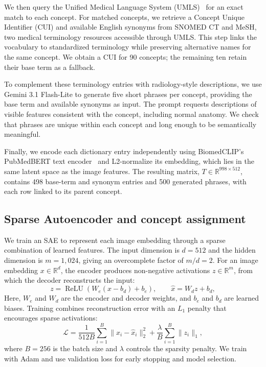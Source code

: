 We then query the Unified Medical Language System (UMLS)~\cite{bodenreider2004umls} for an exact match to each concept. For matched concepts, we retrieve a Concept Unique Identifier (CUI) and available English synonyms from SNOMED CT and MeSH, two medical terminology resources accessible through UMLS. This step links the vocabulary to standardized terminology while preserving alternative names for the same concept. We obtain a CUI for 90 concepts; the remaining ten retain their base term as a fallback.

To complement these terminology entries with radiology-style descriptions, we use Gemini 3.1 Flash-Lite to generate five short phrases per concept, providing the base term and available synonyms as input. The prompt requests descriptions of visible features consistent with the concept, including normal anatomy. We check that phrases are unique within each concept and long enough to be semantically meaningful. 

Finally, we encode each dictionary entry independently using BiomedCLIP’s PubMedBERT text encoder~\cite{zhang2023biomedclip} and L2-normalize its embedding, which lies in the same latent space as the image features. The resulting matrix, \(T\in\mathbb{R}^{998\times512}\), contains 498 base-term and synonym entries and 500 generated phrases, with each row linked to its parent concept.


\subsection{Sparse Autoencoder and concept assignment}
We train an SAE to represent each image embedding through a sparse combination of learned features. The input dimension is $d=512$ and the hidden dimension is $m=1,024$, giving an overcomplete factor of $m/d=2$. For an image embedding $x\in\mathbb{R}^{d}$, the encoder produces non-negative activations $z\in\mathbb{R}^{m}$, from which the decoder reconstructs the input:
\begin{equation}
z=\operatorname{ReLU}(W_e(x-b_d)+b_e),\qquad
\hat{x}=W_dz+b_d,
\end{equation}
Here, $W_e$ and $W_d$ are the encoder and decoder weights, and $b_e$ and $b_d$ are learned biases. Training combines reconstruction error with an $L_1$ penalty that encourages sparse activations:
\begin{equation}
\mathcal{L}=\frac{1}{512B}\sum_{i=1}^{B}\|x_i-\hat{x}_i\|_2^2
+\frac{\lambda}{B}\sum_{i=1}^{B}\|z_i\|_1,
\end{equation}
where $B=256$ is the batch size and $\lambda$ controls the sparsity penalty. We train with Adam and use validation loss for early stopping and model selection.

